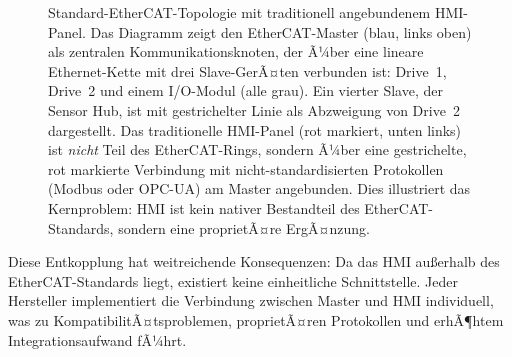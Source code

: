 ﻿\documentclass[12pt,a4paper]{article}
\begin{document}
\begin{figure}[H]
\centering
{}
\caption{Standard-EtherCAT-Topologie mit traditionell angebundenem HMI-Panel. Das
  Diagramm zeigt den EtherCAT-Master (blau, links oben) als zentralen Kommunikationsknoten,
  der Ã¼ber eine lineare Ethernet-Kette mit drei Slave-GerÃ¤ten verbunden ist: Drive~1,
  Drive~2 und einem I/O-Modul (alle grau). Ein vierter Slave, der Sensor Hub, ist mit
  gestrichelter Linie als Abzweigung von Drive~2 dargestellt. Das traditionelle HMI-Panel
  (rot markiert, unten links) ist \emph{nicht} Teil des EtherCAT-Rings, sondern Ã¼ber eine
  gestrichelte, rot markierte Verbindung mit nicht-standardisierten Protokollen (Modbus oder
  OPC-UA) am Master angebunden. Dies illustriert das Kernproblem: HMI ist kein nativer
  Bestandteil des EtherCAT-Standards, sondern eine proprietÃ¤re ErgÃ¤nzung.}
\label{fig:ethercat_topology}
\end{figure}

Diese Entkopplung hat weitreichende Konsequenzen: Da das HMI au\ss{}erhalb des
EtherCAT-Standards liegt, existiert keine einheitliche Schnittstelle. Jeder Hersteller
implementiert die Verbindung zwischen Master und HMI individuell, was zu
KompatibilitÃ¤tsproblemen, proprietÃ¤ren Protokollen und erhÃ¶htem Integrationsaufwand fÃ¼hrt.
\end{document}
